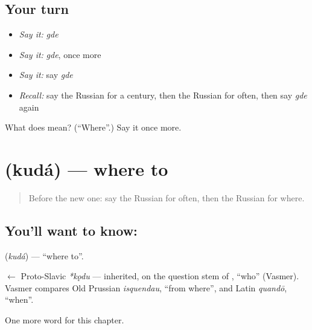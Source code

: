 \subsection*{Your turn}
\begin{itemize}
\raggedright
  \item \emph{Say it:} \emph{gde}
  \item \emph{Say it:} \emph{gde}, once more
  \item \emph{Say it:} say \emph{gde}
  \item \emph{Recall:} say the Russian for a century, then the Russian for often, then say \emph{gde} again
\end{itemize}

\begin{tcolorbox}[breakable,colback=teal!4,colframe=teal!35!black,title={Before you move on}]
What does  mean? (\textquotedblleft{}Where\textquotedblright{}.) Say it once more.
\end{tcolorbox}
\section[\texorpdfstring{\ru{куда} (kudá)}{куда (kudá)}]{ (kudá) — where to}

\label{lesson:RU-C86-where-to}



\begin{quote}
Before the new one: say the Russian for often, then the Russian for where.
\end{quote}

\subsection*{You'll want to know: }
\textbf{} (\emph{kudá}) — \textquotedblleft{}where to\textquotedblright{}.

\begin{cousinweb}
\textbf{} $\leftarrow$ Proto-Slavic \emph{*kǫdu} — inherited, on the question stem of \emph{}, \textquotedblleft{}who\textquotedblright{} (Vasmer). Vasmer compares Old Prussian \emph{isquendau}, \textquotedblleft{}from where\textquotedblright{}, and Latin \emph{quandō}, \textquotedblleft{}when\textquotedblright{}.
\end{cousinweb}

\begin{grammarlens}[title={What you've built}]
One more word for this chapter.
\end{grammarlens}

